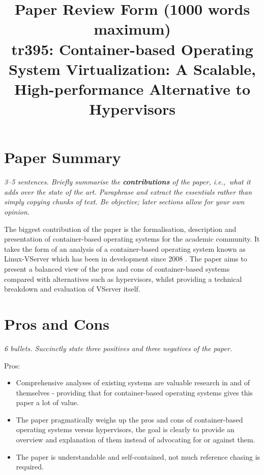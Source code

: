 \documentclass[11pt]{article}
\begin{document}

\title{Paper Review Form (1000 words maximum)\\
    tr395: Container-based Operating System Virtualization: A Scalable, High-performance Alternative to Hypervisors \cite{Containers}}

\maketitle

\section*{Paper Summary}

\textsl{3--5 sentences. Briefly summarise the {\bf contributions} of the paper,
i.e.,~what it adds over the state of the art. Paraphrase and extract the
essentials rather than simply copying chunks of text. Be objective; later
sections allow for your own opinion.}

The biggest contribution of the paper is the formalisation, description and
presentation of container-based operating systems for the academic community.
It takes the form of an analysis of a container-based operating system known as
Linux-VServer which has been in development since 2008 \cite{LinuxVServer}. The
paper aims to present a balanced view of the pros and cons of container-based
systems compared with alternatives such as hypervisors, whilst providing a
technical breakdown and evaluation of VServer itself.

\section*{Pros and Cons}

\textsl{6 bullets. Succinctly state three positives and three negatives of the
paper.}

Pros:

\begin{itemize}

    \item Comprehensive analyses of existing systems are valuable research in
    and of themselves - providing that for container-based operating systems
    gives this paper a lot of value.

    \item The paper pragmatically weighs up the pros and cons of
    container-based operating systems versus hypervisors, the goal is clearly
    to provide an overview and explanation of them instead of advocating for or
    against them.

    \item The paper is understandable and self-contained, not much reference
    chasing is required.

\end{itemize}
\end{document}
